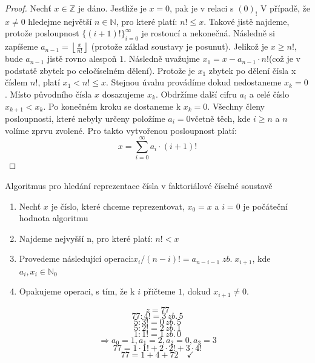 \documentclass[czech,bachelor,dept470,male]{diploma}
\begin{document}
\begin{proof}\label{faktDF}
	Nechť $x\in\mathbb{Z}$ je dáno. Jestliže je $x=0$, pak je v relaci s $(0)_!$ V případě, že $x\ne0$ hledejme největší $n\in\mathbb{N}$, pro které platí: $n!\le x$. Takové jistě najdeme, protože posloupnost $\{(i+1)!\}_{i=0}^\infty$ je rostoucí a nekonečná. Následně si zapíšeme $a_{n-1}=\left\lfloor\frac{x}{n!}\right\rfloor$ (protože základ soustavy je posunut). Jelikož je $x\ge n!$, bude $a_{n-1}$ jistě rovno alespoň $1$. Následně uvažujme $x_1 = x - a_{n-1}\cdot n!$\newline (což je v podstatě zbytek po celočíselném dělení).
	Protože je $x_1$ zbytek po dělení čísla x číslem $n!$, platí $x_1<n!\le x$. Stejnou úvahu provádíme dokud nedostaneme $x_k=0$. Místo původního čísla $x$ dosazujeme $x_k$. Obdržíme další cifru $a_i$ a celé číslo $x_{k+1}<x_k$. Po konečném kroku se dostaneme k $x_k=0$. Všechny členy posloupnosti, které nebyly určeny položíme $a_i=0$\newline včetně těch, kde $i\ge n$ a $n$ volíme zprvu zvolené. Pro takto vytvořenou posloupnost platí: $$x=\sum_{i=0}^\infty a_i\cdot(i + 1)!$$\newpage
\end{proof}
\begin{remark}\label{algoFakt} Algoritmus pro hledání reprezentace čísla v faktoriálové číselné soustavě
	\begin{enumerate}
		\item Nechť $x$ je číslo, které chceme reprezentovat, $x_0 = x$ a $i=0$ je počáteční hodnota algoritmu
		\item Najdeme nejvyšší n, pro které platí: $n! < x$
		\item Provedeme následující operaci:\newline $x_i/(n-i)!=a_{n-i-1}\;zb.\;x_{i+1}$, kde $ a_i,x_i\in\mathbb{N}_0$
		\item Opakujeme operaci, s tím, že k $i$ přičteme $1$, dokud $x_{i+1}\ne0$.
	\end{enumerate}
\end{remark}
\begin{example}
	$$z=77$$
	$$77:4!=3\,zb.\,5$$
	$$5:3!=0\,zb.\,5$$
	$$5:2!=2\,zb.\,1$$
	$$1:1!=1\,zb.\,0$$
	$$\Rightarrow a_0=1, a_1=2,a_2=0,a_3=3$$
	$$ 77 = 1 \cdot 1! + 2 \cdot 2! + 3\cdot 4!$$
	$$ 77 = 1 + 4 + 72 \quad \checkmark$$
\end{example}
\end{document}
